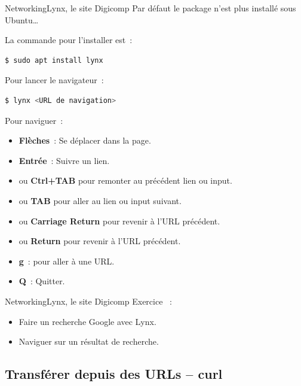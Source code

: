 \documentclass{beamer}
\begin{document}
    \begin{frame}[fragile]{Networking}{Lynx, le site Digicomp}
        Par défaut le package n'est plus installé sous Ubuntu\ldots

        La commande pour l'installer est~:
        \begin{lstlisting}[language=bash]
$ sudo apt install lynx
        \end{lstlisting}
        Pour lancer le navigateur~:
        \begin{lstlisting}[language=bash]
$ lynx <URL de navigation>
        \end{lstlisting}
        Pour naviguer~:
        \begin{itemize}
            \item \textbf{Flèches}~: Se déplacer dans la page.
            \item \textbf{Entrée}~: Suivre un lien.
            \item {} ou \textbf{Ctrl+TAB} pour remonter au précédent lien ou input.
            \item {} ou \textbf{TAB} pour aller au lien ou input suivant.
            \item {} ou \textbf{Carriage Return} pour revenir à l'URL précédent.
            \item {} ou \textbf{Return} pour revenir à l'URL précédent.
            \item \textbf{g}~: pour aller à une URL.
            \item \textbf{Q}~: Quitter.
        \end{itemize}
    \end{frame}

    \begin{frame}{Networking}{Lynx, le site Digicomp}
        Exercice \execcounterdispinc~:
        \begin{itemize}
            \item Faire un recherche Google avec Lynx.
            \item Naviguer sur un résultat de recherche.
        \end{itemize}
    \end{frame}

    \subsection{Transférer depuis des URLs – curl}\label{subsec:curl}
\end{document}
